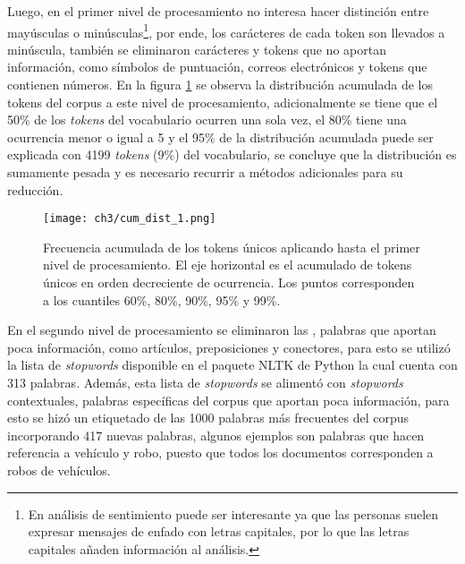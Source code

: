 \documentclass[letterpaper,12pt,oneside]{book} %
\begin{document}
Luego, en el primer nivel de procesamiento no interesa hacer distinción entre mayúsculas o minúsculas\footnote{En análisis de sentimiento puede ser interesante ya que las personas suelen expresar mensajes de enfado con letras capitales, por lo que las letras capitales añaden información al análisis.}, por ende, los carácteres de cada token son llevados a minúscula, también se eliminaron carácteres y tokens que no aportan información, como símbolos de puntuación, correos electrónicos y tokens que contienen números. En la figura \ref{img:cum_dist1} se observa la distribución acumulada de los tokens del corpus a este nivel de procesamiento, adicionalmente se tiene que el 50\% de los \textit{tokens} del vocabulario ocurren una sola vez, el 80\% tiene una ocurrencia menor o igual a 5 y el 95\% de la distribución acumulada puede ser explicada con 4199 \textit{tokens} (9\%) del vocabulario, se concluye que la distribución es sumamente pesada y es necesario recurrir a métodos adicionales para su reducción. \\

\begin{figure}
    \centering
    \texttt{[image: ch3/cum\_dist\_1.png]}
    \caption{Frecuencia acumulada de los tokens únicos aplicando hasta el primer nivel de procesamiento. El eje horizontal es el acumulado de tokens únicos en orden decreciente de ocurrencia. Los puntos corresponden a los cuantiles 60\%, 80\%, 90\%, 95\% y 99\%.}
    \label{img:cum_dist1}
\end{figure}

En el segundo nivel de procesamiento se eliminaron las , palabras que aportan poca información, como artículos, preposiciones y conectores, para esto se utilizó la lista de \textit{stopwords} disponible en el paquete NLTK de Python \citep{bird2009natural} la cual cuenta con 313 palabras. Además, esta lista de \textit{stopwords} se alimentó con \textit{stopwords} contextuales, palabras específicas del corpus que aportan poca información, para esto se hizó un etiquetado de las 1000 palabras más frecuentes del corpus incorporando 417 nuevas palabras, algunos ejemplos son palabras que hacen referencia a vehículo y robo, puesto que todos los documentos corresponden a robos de vehículos.\\
\end{document}

